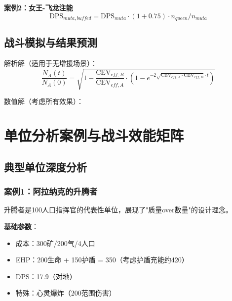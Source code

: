 \documentclass[a4paper,12pt]{article}
\begin{document}
\textbf{案例2：女王-飞龙注能}
\begin{equation}
\text{DPS}_{muta,buffed} = \text{DPS}_{muta} \cdot (1 + 0.75) \cdot n_{queen}/n_{muta}
\end{equation}

\subsection{战斗模拟与结果预测}
解析解（适用于无增援场景）：
\begin{equation}
\frac{N_A(t)}{N_A(0)} = \sqrt{1 - \frac{\text{CEV}_{eff,B}}{\text{CEV}_{eff,A}} \cdot (1 - e^{-2\sqrt{\text{CEV}_{eff,A} \cdot \text{CEV}_{eff,B}} \cdot t})}
\end{equation}

数值解（考虑所有效果）：
\begin{center}
\end{center}

\section{单位分析案例与战斗效能矩阵}

\subsection{典型单位深度分析}

\subsubsection{案例1：阿拉纳克的升腾者}
升腾者是100人口指挥官的代表性单位，展现了"质量over数量"的设计理念。

\textbf{基础参数}：
\begin{itemize}
\item 成本：300矿/200气/4人口
\item EHP：200生命 + 150护盾 = 350（考虑护盾充能约420）
\item DPS：17.9（对地）
\item 特殊：心灵爆炸（200范围伤害）
\end{itemize}
\end{document}
